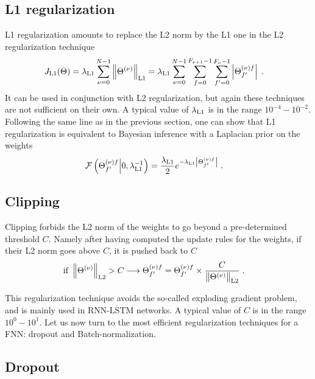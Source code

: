 \subsection{L1 regularization}

L1 regularization amounts to replace the L2 norm by the L1 one in the L2 regularization technique 
\begin{align}
J_{{\rm L1}}(\Theta)&=\lambda_{{\rm L1}} \sum_{\nu=0}^{N-1}\left\|\Theta^{(\nu)}\right\|_{{\rm L1}}
%
=\lambda_{{\rm L1}}\sum_{\nu=0}^{N-1}\sum_{f=0}^{F_{\nu+1}-1}\sum_{f'=0}^{F_\nu-1}
%
\left|\Theta^{(\nu)f}_{f'}\right|\;.
\end{align}
It can be used in conjunction with L2 regularization, but again these techniques are not sufficient on their own. A typical value of $\lambda_{{\rm L1}}$ is in the range $10^{-4}-10^{-2}$. Following the same line as in the previous section, one can show that L1 regularization is equivalent to Bayesian inference with a Laplacian prior on the weights
\begin{align}
\mathcal{F}\left(\Theta^{(\nu)f}_{f'}\middle| 0,\lambda_{{\rm L1}}^{-1}\right)&=
%
\frac{\lambda_{{\rm L1}}}{2}e^{-\lambda_{{\rm L1}}\left|\Theta^{(\nu)f}_{f'}\right|}\;.
\end{align}
 
\subsection{Clipping}

Clipping forbids the L2 norm of the weights to go beyond a pre-determined threshold $C$. Namely after having computed the update rules for the weights, if their L2 norm goes above $C$, it is pushed back to $C$
\begin{align}
{\rm if}\;\left\|\Theta^{(\nu)}\right\|_{{\rm L2}}>C \longrightarrow \Theta^{(\nu)f}_{f'}&=
%
\Theta^{(\nu)f}_{f'} \times \frac{C}{\left\|\Theta^{(\nu)}\right\|_{{\rm L2}}}\;.
\end{align}
 
This regularization technique avoids the so-called exploding gradient problem, and is mainly used in RNN-LSTM networks. A typical value of $C$ is in the range $10^{0}-10^{1}$. Let us now turn to the most efficient regularization techniques for a FNN: dropout and Batch-normalization. 
 
 
\subsection{Dropout}

